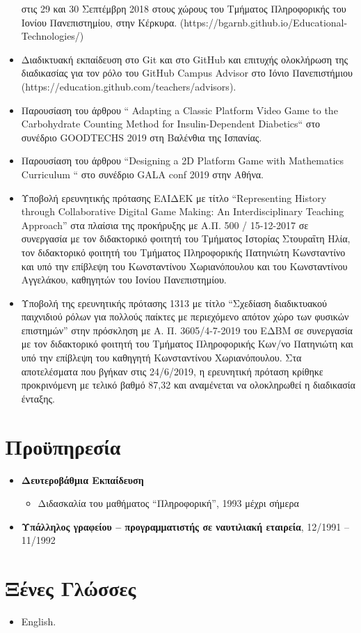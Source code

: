 \documentclass[%
    11pt,
  oneside
  ]{memoir}
\let\oldsection\section
\renewcommand{\section}[1]{%
  \oldsection{#1}
  \leavevmode
  \par
  \vspace{\dimexpr-\baselineskip-\parskip}
}
\begin{document}
\begin{itemize}
  στις 29 και 30 Σεπτέμβρη 2018 στους χώρους του Τμήματος Πληροφορικής
  του Ιονίου Πανεπιστημίου, στην Κέρκυρα.
  (https://bgarnb.github.io/Educational-Technologies/)
\item
  Διαδικτυακή εκπαίδευση στο Git και στο GitHub και επιτυχής ολοκλήρωση
  της διαδικασίας για τον ρόλο του GitHub Campus Advisor στο Ιόνιο
  Πανεπιστήμιου (https://education.github.com/teachers/advisors).
\item
  Παρουσίαση του άρθρου `` Adapting a Classic Platform Video Game to the
  Carbohydrate Counting Method for Insulin-Dependent Diabetics`` στο
  συνέδριο GOODTECHS 2019 στη Βαλένθια της Ισπανίας.
\item
  Παρουσίαση του άρθρου ``Designing a 2D Platform Game with Mathematics
  Curriculum `` στο συνέδριο GALA conf 2019 στην Αθήνα.
\item
  Υποβολή ερευνητικής πρότασης ΕΛΙΔΕΚ με τίτλο ``Representing History
  through Collaborative Digital Game Making: An Interdisciplinary
  Teaching Approach'' στα πλαίσια της προκήρυξης με Α.Π. 500 /
  15-12-2017 σε συνεργασία με τον διδακτορικό φοιτητή του Tμήματος
  Ιστορίας Στουραΐτη Ηλία, τον διδακτορικό φοιτητή του Tμήματος
  Πληροφορικής Πατηνιώτη Κωνσταντίνο και υπό την επίβλεψη του
  Κωνσταντίνου Χωριανόπουλου και του Κωνσταντίνου Αγγελάκου, καθηγητών
  του Ιονίου Πανεπιστημίου.
\item
  Υποβολή της ερευνητικής πρότασης 1313 με τίτλο ``Σχεδίαση διαδικτυακού
  παιχνιδιού ρόλων για πολλούς παίκτες με περιεχόμενο απότον χώρο των
  φυσικών επιστημών'' στην πρόσκληση με Α. Π. 3605/4-7-2019 του ΕΔΒΜ σε
  συνεργασία με τον διδακτορικό φοιτητή του Τμήματος Πληροφορικής Κων/νο
  Πατηνιώτη και υπό την επίβλεψη του καθηγητή Κωνσταντίνου
  Χωριανόπουλου. Στα αποτελέσματα που βγήκαν στις 24/6/2019, η
  ερευνητική πρόταση κρίθηκε προκρινόμενη με τελικό βαθμό 87,32 και
  αναμένεται να ολοκληρωθεί η διαδικασία ένταξης.
\end{itemize}

\hypertarget{ux3c0ux3c1ux3bfux3cbux3c0ux3b7ux3c1ux3b5ux3c3ux3afux3b1}{%
\section{Προϋπηρεσία}\label{ux3c0ux3c1ux3bfux3cbux3c0ux3b7ux3c1ux3b5ux3c3ux3afux3b1}}

\begin{itemize}
\tightlist
\item
  \textbf{Δευτεροβάθμια Εκπαίδευση}

  \begin{itemize}
  \tightlist
  \item
    Διδασκαλία του μαθήματος ``Πληροφορική'', 1993 μέχρι σήμερα
  \end{itemize}
\item
  \textbf{Υπάλληλος γραφείου -- προγραμματιστής σε ναυτιλιακή εταιρεία},
  12/1991 -- 11/1992
\end{itemize}

\hypertarget{ux3beux3adux3bdux3b5ux3c2-ux3b3ux3bbux3ceux3c3ux3c3ux3b5ux3c2}{%
\section{Ξένες
Γλώσσες}\label{ux3beux3adux3bdux3b5ux3c2-ux3b3ux3bbux3ceux3c3ux3c3ux3b5ux3c2}}

\begin{itemize}
\tightlist
\item
  English.
\end{itemize}
\end{document}
